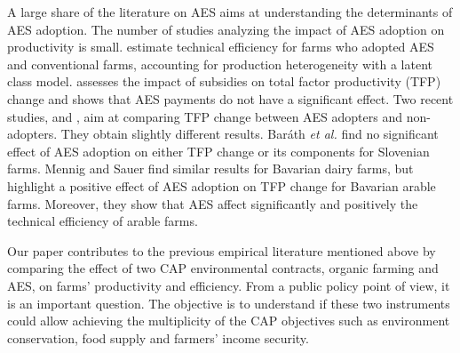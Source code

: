 \begin{Article}
\begin{refsection}[Lassalas]
A large share of the literature on AES aims at understanding the
determinants of AES adoption. The number of studies analyzing the impact
of AES adoption on productivity is small. \textcite{dakpo_latruffe_desjeux_jeanneaux_2022}
estimate technical efficiency for farms who adopted AES and conventional
farms, accounting for production heterogeneity with a latent class
model. \textcite{mary_2013} assesses the impact of subsidies on total factor
productivity (TFP) change and shows that AES payments do not have a
significant effect. Two recent studies, \textcite{barath2020effect}
and \textcite{mennig_sauer_2020}, aim at comparing TFP change between AES
adopters and non-adopters. They obtain slightly different results.
Baráth \emph{et al.} find no significant effect of AES
adoption on either TFP change or its components for Slovenian farms.
Mennig and Sauer find similar results for Bavarian dairy
farms, but highlight a positive effect of AES adoption on TFP change for
Bavarian arable farms. Moreover, they show that AES affect significantly
and positively the technical efficiency of arable farms.

Our paper contributes to the previous empirical literature mentioned
above by comparing the effect of two CAP environmental contracts,
organic farming and AES, on farms' productivity and efficiency. From a
public policy point of view, it is an important question. The objective
is to understand if these two instruments could allow achieving the
multiplicity of the CAP objectives such as environment conservation,
food supply and farmers' income security.


\end{refsection}
\end{Article}
